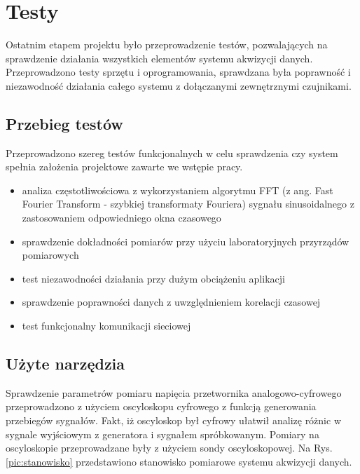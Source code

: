 \chapter{Testy}
\label{ch:testy}

Ostatnim etapem projektu było przeprowadzenie testów, pozwalających na sprawdzenie działania wszystkich elementów systemu akwizycji danych. Przeprowadzono testy sprzętu i oprogramowania, sprawdzana była poprawność i niezawodność działania całego systemu z dołączanymi zewnętrznymi czujnikami.

 
\section{Przebieg testów}
Przeprowadzono szereg testów funkcjonalnych w celu sprawdzenia czy system spełnia założenia projektowe zawarte we wstępie pracy. 


\begin{itemize}
\item analiza częstotliwościowa z wykorzystaniem algorytmu FFT (z ang. Fast Fourier Transform - szybkiej transformaty Fouriera) sygnału sinusoidalnego z zastosowaniem odpowiedniego okna czasowego
\item sprawdzenie dokładności pomiarów przy użyciu laboratoryjnych przyrządów pomiarowych 
\item test niezawodności działania przy dużym obciążeniu aplikacji
\item sprawdzenie poprawności danych z uwzględnieniem korelacji czasowej
\item test funkcjonalny komunikacji sieciowej
\end{itemize}

\section{Użyte narzędzia}
Sprawdzenie parametrów pomiaru napięcia przetwornika analogowo-cyfrowego przeprowadzono z użyciem oscyloskopu cyfrowego z funkcją generowania przebiegów sygnałów. Fakt, iż oscyloskop był cyfrowy ułatwił analizę różnic w sygnale wyjściowym z generatora i sygnałem spróbkowanym. Pomiary na oscyloskopie przeprowadzane były z użyciem sondy oscyloskopowej. Na Rys. \ref{pic:stanowisko} przedstawiono stanowisko pomiarowe systemu akwizycji danych.

